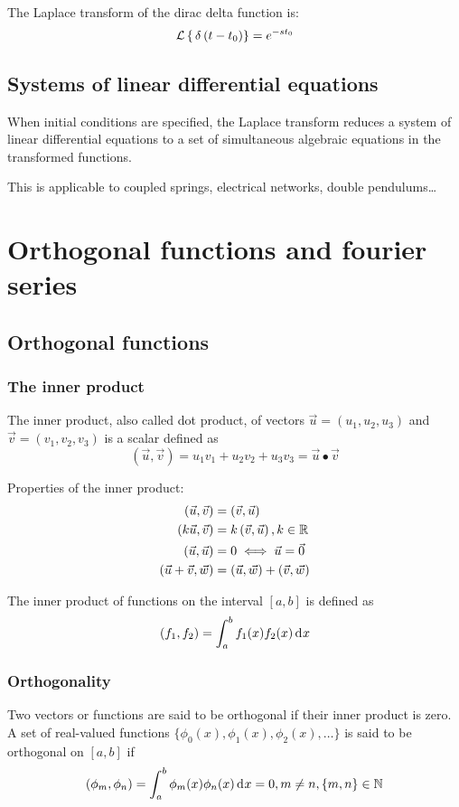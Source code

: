 \documentclass[10pt, twocolumn]{article}
\begin{document}
The Laplace transform of the dirac delta function is:
\[
  \mathcal{L}\left\{ \,\delta_{}\left( t - t_0 \right) \right\} = e^{-st_0}
\]


\subsection{Systems of linear differential equations}
When initial conditions are specified, the Laplace transform reduces a system of linear differential equations to a set of simultaneous algebraic equations in the transformed functions.

This is applicable to coupled springs, electrical networks, double pendulums\dots{}


\section{Orthogonal functions and fourier series}
\subsection{Orthogonal functions}
\subsubsection{The inner product}
The inner product, also called dot product, of vectors \(\vec{u} = (u_1,u_2,u_3)\) and \(\vec{v} = (v_1,v_2,v_3)\) is a scalar defined as
\[
  \left( \vec{u}, \vec{v} \right) = u_1 v_1 + u_2 v_2 + u_3 v_3 = \vec{u} \bullet \vec{v}
\]

Properties of the inner product:
\begin{align}
  \left( \vec{u}, \vec{v} \right)           & = \left( \vec{v}, \vec{u} \right)                                   \\
  \left( k\vec{u}, \vec{v} \right)          & = k \left( \vec{v}, \vec{u} \right), k \in \mathbb{R}_{}^{}              \\
  \left( \vec{u}, \vec{u} \right)           & = 0 \iff \vec{u} = \vec{0}                                          \\
  \left( \vec{u} + \vec{v}, \vec{w} \right) & = \left( \vec{u}, \vec{w} \right) + \left( \vec{v}, \vec{w} \right)
\end{align}


The inner product of functions on the interval \([a,b]\) is defined as
\[
  (f_1, f_2) = \int_a^b{f_1(x)f_2(x) \,\mathrm{d}^{} x}
\]


\subsubsection{Orthogonality}
Two vectors or functions are said to be orthogonal if their inner product is zero.
A set of real-valued functions \(\{\phi_0(x), \phi_1(x), \phi_2(x), \dots\}\) is said to be orthogonal on \([a,b]\) if
\[
  (\phi_m, \phi_n) = \int_a^b{\phi_m(x)\phi_n(x) \,\mathrm{d}^{} x} = 0, m \neq n, \{m,n\} \in \mathbb{N}_{}^{}
\]
\end{document}
